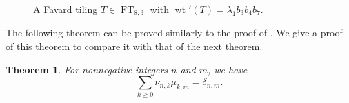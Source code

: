 \documentclass[oneside]{book}
\numberwithin{equation}{section}
\newtheorem{thm}{Theorem}[section]
\theoremstyle{definition}
\newcommand\FT{\operatorname{FT}}
\newcommand\wt{\operatorname{wt}}
\def\BM#1{\draw [line width=2pt] (#1+0.9,0.9) rectangle +(-0.8,-0.8);}
\def\RM#1{\draw [line width=2pt,red] (#1+0.9,0.9) rectangle +(-0.8,-0.8);}
\def\BD#1{\draw [line width=2pt] (#1+0.9,0.9) rectangle +(-1.8,-0.8);}
\def\LBM#1{\BM{#1} \node at (#1+0.5, 1.3) {$-b_{#1}$};}
\def\LBD#1{\BD{#1} \node at (#1, 1.3) {$-\lambda_{#1}$};}
\begin{document}
\begin{figure}
  \centering
{}
\caption{A Favard tiling $T\in\FT_{8,3}$ with
  $\wt'(T)=\lambda_1 b_3b_4b_7$.}
\label{fig:2}
\end{figure}


The following theorem can be proved similarly to the proof of
. We give a proof of this theorem to compare it with that
of the next theorem.

\begin{thm}\label{thm:1}
  For nonnegative integers \( n \) and \( m \), we have
  \[
    \sum_{k\ge0} \nu_{n,k}\mu_{k,m} = \delta_{n,m}.
  \]
\end{thm}
\end{document}
